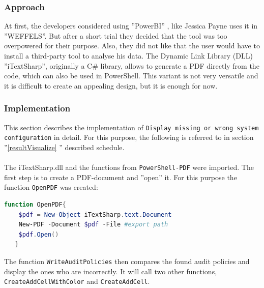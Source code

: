 \subsubsection{Approach}
At first, the developers considered using ''PowerBI'' \cite{PowerBI}, like Jessica Payne uses it in ''WEFFELS''. But after a short trial they decided that the tool was too overpowered for their purpose. Also, they did not like that the user would have to install a third-party tool to analyse his data. The Dynamic Link Library (DLL) ''iTextSharp'', originally a C\# library, allows to generate a PDF directly from the code, which can also be used in PowerShell. This variant is not very versatile and it is difficult to create an appealing design, but it is enough for now. 

\subsubsection{Implementation}
This section describes the implementation of \lstinline|Display missing or wrong system configuration| in detail. For this purpose, the following is referred to in section ''\ref{resultVisualize} '' described schedule. \\\\
The iTextSharp.dll and the functions from \lstinline|PowerShell-PDF| \cite{PowerShell-PDF} were imported. The first step is to create a PDF-document and ''open'' it. For this purpose the function \lstinline|OpenPDF| was created:
\begin{lstlisting}[caption=Function OpenPDF, language=PowerShell]
function OpenPDF{
    $pdf = New-Object iTextSharp.text.Document 
    New-PDF -Document $pdf -File #export path
    $pdf.Open()
   }
\end{lstlisting}
The function \lstinline|WriteAuditPolicies| then compares the found audit policies and display the ones who are incorrectly. It will call two other functions, \lstinline|CreateAddCellWithColor| and \lstinline|CreateAddCell|.
